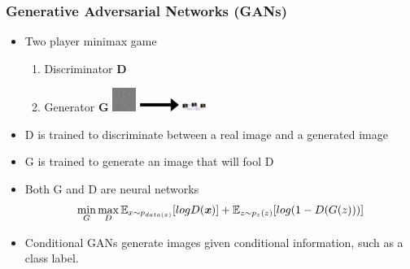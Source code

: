 \documentclass{beamer}
\begin{document}
\begin{frame}
\frametitle{\textbf{Generative Adversarial Networks (GANs)}}
   \begin{itemize}
      \item Two player minimax game
	   \begin{enumerate}[$-$]
         \item Discriminator \textbf{D}
         \item Generator \textbf{G}
      \hspace{30mm}\includegraphics[width=0.3in]{noise} \hspace{2mm}\includegraphics[width=0.5in]{arrow} \hspace{1mm} \includegraphics[width=0.3in]{5}
	   \end{enumerate}
      \item D is trained to discriminate between a real image and a generated image
	   \item G is trained to generate an image that will fool D
	   \item Both G and D are neural networks
      \[\min\limits_{G}\max\limits_{D} \mathbb{E}_{x \sim p_{data(x)}} [logD(\textbf{\textit{x}})] + \mathbb{E}_{z \sim p_z(z)}[log(1 - D(G(z)))]\]
	   \item Conditional GANs generate images given conditional information, such as a class label.
   \end{itemize}
\end{frame}
\end{document}
